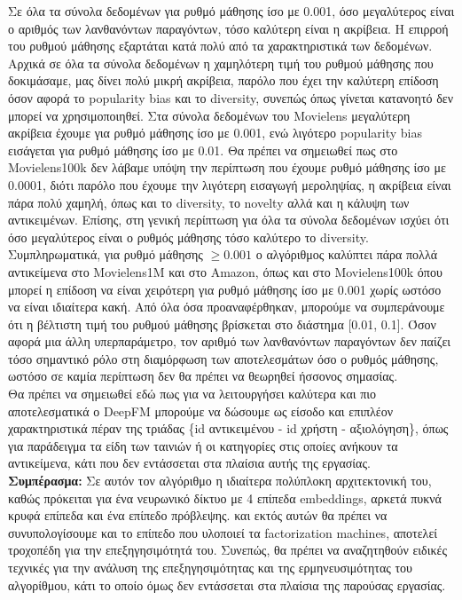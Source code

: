 \noindent Σε όλα τα σύνολα δεδομένων για ρυθμό μάθησης ίσο με 0.001, όσο μεγαλύτερος είναι ο αριθμός των λανθανόντων παραγόντων, τόσο καλύτερη είναι η ακρίβεια. Η επιρροή του ρυθμού μάθησης εξαρτάται κατά πολύ από τα χαρακτηριστικά των δεδομένων. Αρχικά σε όλα τα σύνολα δεδομένων η χαμηλότερη τιμή του ρυθμού μάθησης που δοκιμάσαμε, μας δίνει πολύ μικρή ακρίβεια, παρόλο που έχει την καλύτερη επίδοση όσον αφορά το popularity bias και το diversity, συνεπώς όπως γίνεται κατανοητό δεν μπορεί να χρησιμοποιηθεί. Στα σύνολα δεδομένων του Movielens μεγαλύτερη ακρίβεια έχουμε για ρυθμό μάθησης ίσο με 0.001, ενώ λιγότερο popularity bias εισάγεται για ρυθμό μάθησης ίσο με 0.01. Θα πρέπει να σημειωθεί πως στο Movielens100k δεν λάβαμε υπόψη την περίπτωση που έχουμε ρυθμό μάθησης ίσο με 0.0001, διότι παρόλο που έχουμε την λιγότερη εισαγωγή μεροληψίας, η ακρίβεια είναι πάρα πολύ χαμηλή, όπως και το diversity, το novelty αλλά και η κάλυψη των αντικειμένων. Επίσης, στη γενική περίπτωση για όλα τα σύνολα δεδομένων ισχύει ότι όσο μεγαλύτερος είναι ο ρυθμός μάθησης τόσο καλύτερο το diversity. Συμπληρωματικά, για ρυθμό μάθησης $  \geq 0.001 $ ο αλγόριθμος καλύπτει πάρα πολλά αντικείμενα στο Movielens1M και στο Amazon, όπως και στο Movielens100k όπου μπορεί η επίδοση να είναι χειρότερη για ρυθμό μάθησης ίσο με 0.001 χωρίς ωστόσο να είναι ιδιαίτερα κακή. Από όλα όσα προαναφέρθηκαν, μπορούμε να συμπεράνουμε ότι η βέλτιστη τιμή του ρυθμού μάθησης βρίσκεται στο διάστημα [0.01, 0.1]. Όσον αφορά μια άλλη υπερπαράμετρο, τον αριθμό των λανθανόντων παραγόντων δεν παίζει τόσο σημαντικό ρόλο στη διαμόρφωση των αποτελεσμάτων όσο ο ρυθμός μάθησης, ωστόσο σε καμία περίπτωση δεν θα πρέπει να θεωρηθεί ήσσονος σημασίας.\\
\noindent Θα πρέπει να σημειωθεί εδώ πως για να λειτουργήσει καλύτερα και πιο αποτελεσματικά ο DeepFM μπορούμε να δώσουμε ως είσοδο και επιπλέον χαρακτηριστικά πέραν της τριάδας \{id αντικειμένου - id χρήστη - αξιολόγηση\}, όπως για παράδειγμα τα είδη των ταινιών ή οι κατηγορίες στις οποίες ανήκουν τα αντικείμενα, κάτι που δεν εντάσσεται στα πλαίσια αυτής της εργασίας. \\
\textbf{Συμπέρασμα:} Σε αυτόν τον αλγόριθμο η ιδιαίτερα πολύπλοκη αρχιτεκτονική του, καθώς πρόκειται για ένα νευρωνικό δίκτυο με 4 επίπεδα embeddings, αρκετά πυκνά κρυφά επίπεδα και ένα επίπεδο πρόβλεψης. και εκτός αυτών θα πρέπει να συνυπολογίσουμε και το επίπεδο που υλοποιεί τα factorization machines, αποτελεί τροχοπέδη για την επεξηγησιμότητά του. Συνεπώς, θα πρέπει να αναζητηθούν ειδικές τεχνικές για την ανάλυση της επεξηγησιμότητας και της ερμηνευσιμότητας του αλγορίθμου, κάτι το οποίο όμως δεν εντάσσεται στα πλαίσια της παρούσας εργασίας.\\
\newpage
